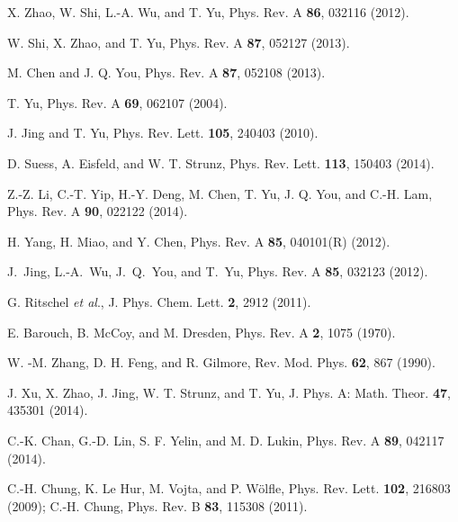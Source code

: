 \documentclass[preprint]{elsarticle}
\begin{document}
\begin{thebibliography}{10}
X. Zhao, W. Shi, L.-A. Wu, and T. Yu, Phys. Rev.
A \textbf{86}, 032116 (2012).

W. Shi, X. Zhao, and T. Yu, Phys. Rev. A \textbf{87},
052127 (2013).

M. Chen and J. Q. You, Phys. Rev. A \textbf{87},
052108 (2013).



T. Yu, Phys. Rev. A \textbf{69}, 062107 (2004).

 J. Jing and T. Yu, Phys. Rev. Lett. \textbf{105},
240403 (2010).

D. Suess, A. Eisfeld, and W. T. Strunz,
Phys. Rev. Lett. \textbf{113}, 150403 (2014).

Z.-Z. Li, C.-T. Yip, H.-Y. Deng, M. Chen, T. Yu, J.
Q. You, and C.-H. Lam, Phys. Rev. A \textbf{90}, 022122 (2014).

 H. Yang, H. Miao, and Y. Chen, Phys. Rev. A \textbf{85},
040101(R) (2012).

J.~Jing, L.-A.~Wu, J.~Q.~You, and T.~Yu, Phys.
Rev. A \textbf{85}, 032123 (2012).

 G. Ritschel \textit{et al}., J. Phys. Chem.
Lett. \textbf{2}, 2912 (2011).


E. Barouch, B. McCoy, and M. Dresden, Phys. Rev.
A \textbf{2}, 1075 (1970).

 W. -M. Zhang, D. H. Feng, and R. Gilmore, Rev.
Mod. Phys. \textbf{62}, 867 (1990).

J. Xu, X. Zhao, J. Jing, W. T. Strunz, and T. Yu,
J. Phys. A: Math. Theor. \textbf{47}, 435301 (2014).

C.-K. Chan, G.-D. Lin, S. F. Yelin, and M. D. Lukin,
Phys. Rev. A \textbf{89}, 042117 (2014).

C.-H. Chung, K. Le Hur, M. Vojta, and P. W\"{o}lfle,
Phys. Rev. Lett. \textbf{102}, 216803 (2009); C.-H. Chung, Phys. Rev.
B \textbf{83}, 115308 (2011).\end{thebibliography}
\end{document}
